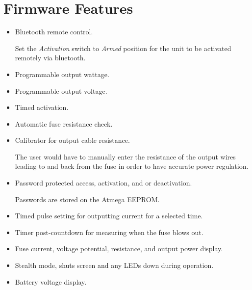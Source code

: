 \documentclass{article}
\begin{document}
\section{Firmware Features}
\begin{itemize}
	\item Bluetooth remote control.
	
	Set the \textit{Activation} switch to \textit{Armed} position for the unit to be activated remotely via bluetooth.
	\item Programmable output wattage.
	\item Programmable output voltage.
	\item Timed activation.
	\item Automatic fuse resistance check.
	\item Calibrator for output cable resistance.
	
	The user would have to manually enter the resistance of the output wires leading to and back from the fuse in order to have accurate power regulation.
	\item Password protected access, activation, and or deactivation.
	
	Passwords are stored on the Atmega EEPROM.
	\item Timed pulse setting for outputting current for a selected time.
	\item Timer post-countdown for measuring when the fuse blows out.
	\item Fuse current, voltage potential, resistance, and output power display.
	\item Stealth mode, shuts screen and any LEDs down during operation.
	\item Battery voltage display.



\end{itemize}
\end{document}

